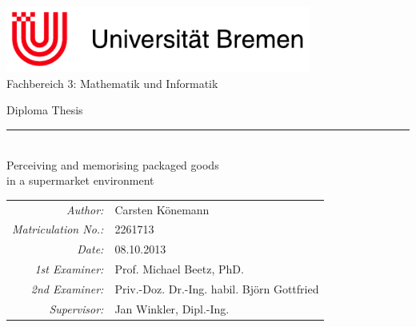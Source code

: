 \begin{titlepage}
  \begin{center}

    \includegraphics[width=0.75\textwidth]{images/institute-logo.pdf}~\\[0cm]
    \textsf{Fachbereich 3: Mathematik und Informatik}\\[3cm]

    \vfill

    \textsf{\LARGE Diploma Thesis}\\[0.125cm]
    \rule{20em}{0.16667pt}\\[0.125cm]
    \textsf{\huge Perceiving and memorising packaged goods \\ in a supermarket environment}\\[3cm]

    \vfill

    \begin{minipage}{\textwidth}
      \centering
      \begin{tabular}{r l}
         \rowcolor{white} \textit{Author:}            & Carsten K\"onemann \\
         \rowcolor{white} \textit{Matriculation No.:} & 2261713 \\
         \rowcolor{white} \textit{Date:}              & 08.10.2013 \\[1cm]
         \rowcolor{white} \textit{1st Examiner:}      & Prof. Michael Beetz, PhD. \\
         \rowcolor{white} \textit{2nd Examiner:}      & Priv.-Doz. Dr.-Ing. habil. Bj\"orn Gottfried \\
         \rowcolor{white} \textit{Supervisor:}        & Jan Winkler, Dipl.-Ing. \\
      \end{tabular}
    \end{minipage}

  \end{center}
\end{titlepage}
